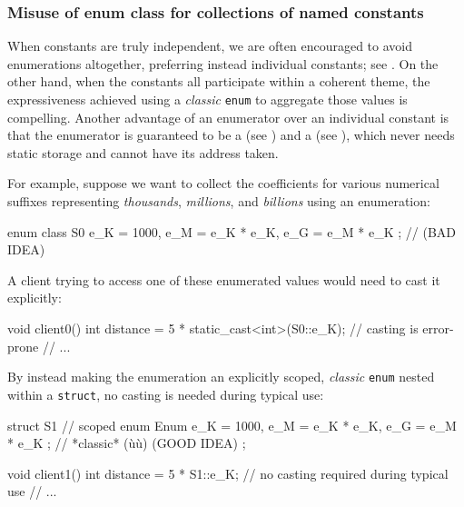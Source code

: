 \subsubsection[Misuse of \lstinline!enum! \lstinline!class! for collections of named constants]{Misuse of {\SubsubsecCode enum} {\SubsubsecCode class} for collections of named constants}\label{misuse-of-enum-class-for-collections-of-named-constants}

When constants are truly independent, we are often encouraged to avoid
enumerations altogether, preferring instead individual constants; see .
On the other hand, when the constants all participate within a coherent
theme, the expressiveness achieved using a \emph{classic} \lstinline!enum!
to aggregate those values is compelling. Another
advantage of an enumerator over an individual constant is that the
enumerator is guaranteed to be a  (see )
  and a  (see ),
  which never needs static storage
  and cannot have its address taken.

For example, suppose we want to collect the coefficients for various
numerical suffixes representing \emph{thousands}, \emph{millions}, and
\emph{billions} using an enumeration:

\begin{emcppslisting}[emcppsbatch=e13]
enum class S0 { e_K = 1000, e_M = e_K * e_K, e_G = e_M * e_K };  // (BAD IDEA)
\end{emcppslisting}

\noindent A client trying to access one of these enumerated values would need to
cast it explicitly:

\begin{emcppslisting}[emcppsbatch=e13]
void client0()
{
    int distance = 5 * static_cast<int>(S0::e_K);  // casting is error-prone
    // ...
}
\end{emcppslisting}

\noindent By instead making the enumeration an explicitly scoped, \emph{classic}
\lstinline!enum! nested within a \lstinline!struct!, no casting is needed
during typical use:

\begin{emcppslisting}
struct S1  // scoped
{
    enum Enum { e_K = 1000, e_M = e_K * e_K, e_G = e_M * e_K };
        // *classic* (ù{}ù) (GOOD IDEA)
};

void client1()
{
    int distance = 5 * S1::e_K;  // no casting required during typical use
    // ...
}
\end{emcppslisting}

